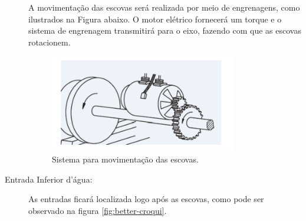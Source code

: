 \begin{description}
A movimentação das escovas será realizada por meio de engrenagens, como ilustrados
na Figura abaixo. O motor elétrico fornecerá um torque e o sistema de
engrenagem transmitirá para o eixo, fazendo com que as escovas rotacionem.
\par
\begin{figure}[h]
  \centering
  \includegraphics[width=0.8\textwidth]{figures/brush-system.png}
  \caption{Sistema para movimentação das escovas.}
  \label{fig:brush-system}
\end{figure}
\FloatBarrier

\item[Entrada Inferior d'água:] As entradas ficará localizada logo após as
escovas, como pode ser observado na figura \ref{fig:better-croqui}.


\end{description}
